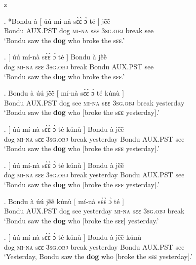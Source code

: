 z   \documentclass{assets/fieldnotes}
\begin{document}
\exg. *Bondu à {[} úú mí-nà sɛ̀ɛ̀ ɔ̀ té {]} jẽ̀ẽ̀\\
Bondu \textsc{AUX.PST} {} dog \textsc{mi-na} sɛɛ \textsc{3sg.obj} break {} see\\
`Bondu saw the \textbf{dog} who broke the sɛɛ.’\\

\exg. {[} úú mí-nà sɛ̀ɛ̀ ɔ̀ té {]} Bondu à jẽ̀ẽ̀\\
{} dog \textsc{mi-na} sɛɛ \textsc{3sg.obj} break {} Bondu \textsc{AUX.PST} see\\
`Bondu saw the \textbf{dog} who broke the sɛɛ.’

\exg. Bondu à úú jẽ̀ẽ̀ {[} mí-nà sɛ̀ɛ̀ ɔ̀ té kúnù {]}\\
Bondu \textsc{AUX.PST} dog see {} \textsc{mi-na} sɛɛ \textsc{3sg.obj} break yesterday {}\\
`Bondu saw the \textbf{dog} who [broke the sɛɛ yesterday].’

\exg. {[} úú mí-nà sɛ̀ɛ̀ ɔ̀ té kúnù {]} Bondu à jẽ̀ẽ̀\\
{} dog \textsc{mi-na} sɛɛ \textsc{3sg.obj} break yesterday {} Bondu \textsc{AUX.PST} see\\
`Bondu saw the \textbf{dog} who [broke the sɛɛ yesterday].’

\exg. {[} úú mí-nà sɛ̀ɛ̀ ɔ̀ té kúnù {]} Bondu à jẽ̀ẽ̀\\
{} dog \textsc{mi-na} sɛɛ \textsc{3sg.obj} break yesterday {} Bondu \textsc{AUX.PST} see\\
`Bondu saw the \textbf{dog} who [broke the sɛɛ yesterday].’

\exg. Bondu à úú jẽ̀ẽ̀ kúnù {[} mí-nà sɛ̀ɛ̀ ɔ̀ té {]}\\
Bondu \textsc{AUX.PST} dog see yesterday {} \textsc{mi-na} sɛɛ \textsc{3sg.obj} break {}\\
`Bondu saw the \textbf{dog} who [broke the sɛɛ] yesterday.’

\exg. {[} úú mí-nà sɛ̀ɛ̀ ɔ̀ té kúnù {]} Bondu à jẽ̀ẽ̀ kúnù\\
{} dog \textsc{mi-na} sɛɛ \textsc{3sg.obj} break yesterday {} Bondu \textsc{AUX.PST} see\\
`Yesterday, Bondu saw the \textbf{dog} who [broke the sɛɛ yesterday].’

\end{document}
